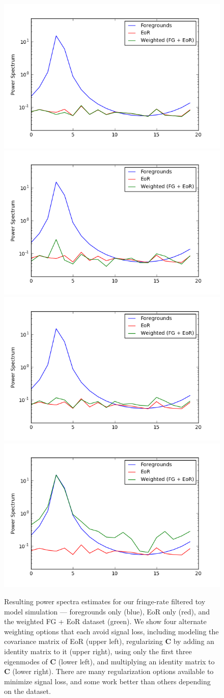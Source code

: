 \documentclass[preprint2,numberedappendix,tighten,twocolappendix]{aastex6}  %
\begin{document}
\begin{figure}
	\centering
	\includegraphics[trim={0.4cm 0.8cm 1.3cm 1cm},clip,height=0.25\textwidth]{plots/toy_sigloss10.png}
	\includegraphics[trim={1cm 0.8cm 1.3cm 1cm},clip,height=0.25\textwidth]{plots/toy_sigloss8.png}
	\includegraphics[trim={0.4cm 0.8cm 1.3cm 1cm},clip,height=0.25\textwidth]{plots/toy_sigloss9.png}
	\includegraphics[trim={1cm 0.8cm 1.3cm 1cm},clip,height=0.25\textwidth]{plots/toy_sigloss11.png}
	\caption{Resulting power spectra estimates for our fringe-rate filtered toy model simulation --- foregrounds only (blue), EoR only (red), and the weighted FG + EoR dataset (green). We show four alternate weighting options that each avoid signal loss, including modeling the covariance matrix of EoR (upper left), regularizing $\textbf{C}$ by adding an identity matrix to it (upper right), using only the first three eigenmodes of $\textbf{C}$ (lower left), and multiplying an identity matrix to $\textbf{C}$ (lower right). There are many regularization options available to minimize signal loss, and some work better than others depending on the dataset.}
	\label{fig:toy_sigloss8}
\end{figure}
\end{document}
